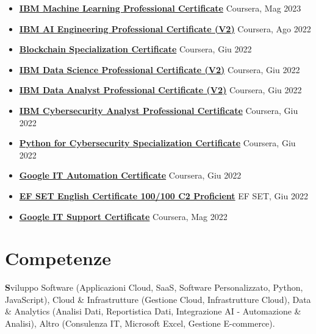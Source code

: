 \documentclass[a4paper,12pt]{article}
\begin{document}
\begin{itemize}[leftmargin=*,itemsep=3pt,parsep=0pt]
\item \textbf{\href{https://www.credly.com/badges/e562c28b-730a-444b-9776-9d1d3429b6a8/linked_in_profile}{IBM Machine Learning Professional Certificate}} \hfill \textnormal{Coursera, Mag 2023}
\item \textbf{\href{https://www.credly.com/badges/40d36ac5-31a2-4ce0-a3c0-b2ea91ff4b64/linked_in_profile}{IBM AI Engineering Professional Certificate (V2)}} \hfill \textnormal{Coursera, Ago 2022}
\item \textbf{\href{https://www.coursera.org/account/accomplishments/specialization/certificate/7RQG4Q277CA2}{Blockchain Specialization Certificate}} \hfill \textnormal{Coursera, Giu 2022}
\item \textbf{\href{https://www.credly.com/badges/41676071-2178-4f58-8db3-3622a90eecfd/linked_in_profile}{IBM Data Science Professional Certificate (V2)}} \hfill \textnormal{Coursera, Giu 2022}
\item \textbf{\href{https://www.credly.com/badges/d7986998-a9ac-4adc-8b2d-cf1edeca2301/linked_in_profile}{IBM Data Analyst Professional Certificate (V2)}} \hfill \textnormal{Coursera, Giu 2022}
\item \textbf{\href{https://www.credly.com/badges/ba500085-e96c-4704-8b80-3d2062089151/linked_in_profile}{IBM Cybersecurity Analyst Professional Certificate}} \hfill \textnormal{Coursera, Giu 2022}
\item \textbf{\href{https://www.coursera.org/account/accomplishments/specialization/certificate/3MEHP7XBU26B}{Python for Cybersecurity Specialization Certificate}} \hfill \textnormal{Coursera, Giu 2022}
\item \textbf{\href{https://www.credly.com/badges/0d6aeb02-1078-4c7b-bdd5-57cc3c2c7d8d/linked_in_profile}{Google IT Automation Certificate}} \hfill \textnormal{Coursera, Giu 2022}
\item \textbf{\href{https://www.efset.org/cert/NeK5Ry}{EF SET English Certificate 100/100 C2 Proficient}} \hfill \textnormal{EF SET, Giu 2022}
\item \textbf{\href{https://www.udemy.com/certificate/UC-250c1c0b-72ce-41ac-bdbc-da21e3e8ee85/}{Google IT Support Certificate}} \hfill \textnormal{Coursera, Mag 2022}

\end{itemize}

\section{Competenze}
\noindent\textbf Sviluppo Software (Applicazioni Cloud, SaaS, Software Personalizzato, Python, JavaScript), Cloud \& Infrastrutture (Gestione Cloud, Infrastrutture Cloud), Data \& Analytics (Analisi Dati, Reportistica Dati, Integrazione AI - Automazione \& Analisi), Altro (Consulenza IT, Microsoft Excel, Gestione E-commerce).
\end{document}
